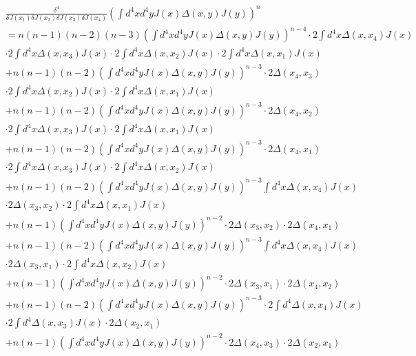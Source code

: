 \documentclass[a4paper]{article}
\begin{document}
\begin{equation}
    \begin{split}
        &\frac{\delta^4}{\delta J(x_{1})\delta J(x_{2})\delta J(x_{3})\delta J(x_{4})}(\int{d^4xd^4yJ(x)\Delta(x,y) J(y)})^{n}\\
        &=n(n-1)(n-2)(n-3)(\int{d^4xd^4yJ(x)\Delta(x,y) J(y)})^{n-4}\cdot 2\int{d^4x \Delta(x,x_{4}) J(x)}\\
        &\cdot 2\int{d^4x \Delta(x,x_{3}) J(x)}\cdot 2\int{d^4x \Delta(x,x_{2}) J(x)}\cdot2\int{d^4x \Delta(x,x_{1}) J(x)}\\
        &+n(n-1)(n-2)(\int{d^4xd^4yJ(x)\Delta(x,y) J(y)})^{n-3}\cdot 2\Delta(x_{4},x_{3})\\ 
        &\cdot 2\int{d^4x \Delta(x,x_{2}) J(x)}\cdot2\int{d^4x \Delta(x,x_{1})J(x)}\\
        &+n(n-1)(n-2)(\int{d^4xd^4yJ(x)\Delta(x,y) J(y)})^{n-3}\cdot 2\Delta(x_{4},x_{2})\\ 
        &\cdot 2\int{d^4x \Delta(x,x_{3}) J(x)}\cdot2\int{d^4x \Delta(x,x_{1})J(x)}\\
        &+n(n-1)(n-2)(\int{d^4xd^4yJ(x)\Delta(x,y) J(y)})^{n-3}\cdot 2\Delta(x_{4},x_{1})\\ 
        &\cdot 2\int{d^4x \Delta(x,x_{3}) J(x)}\cdot2\int{d^4x \Delta(x,x_{2})J(x)}\\
        &+n(n-1)(n-2)(\int{d^4xd^4yJ(x)\Delta(x,y) J(y)})^{n-3}\int{d^4x \Delta(x,x_{4})J(x)}\\
        &\cdot 2 \Delta(x_{3},x_{2})\cdot2\int{d^4x \Delta(x,x_{1})J(x)}\\
        &+n(n-1)(\int{d^4xd^4yJ(x)\Delta(x,y) J(y)})^{n-2}\cdot 2 \Delta(x_{3},x_{2})\cdot2 \Delta(x_{4},x_{1})\\
        &+n(n-1)(n-2)(\int{d^4xd^4yJ(x)\Delta(x,y) J(y)})^{n-3}\int{d^4x \Delta(x,x_{4})J(x)}\\
        &\cdot 2 \Delta(x_{3},x_{1})\cdot2\int{d^4x \Delta(x,x_{2})J(x)}\\
        &+n(n-1)(\int{d^4xd^4yJ(x)\Delta(x,y) J(y)})^{n-2}\cdot 2 \Delta(x_{3},x_{1})\cdot2 \Delta(x_{4},x_{2})\\
        &+n(n-1)(n-2)(\int{d^4xd^4yJ(x)\Delta(x,y) J(y)})^{n-3}\cdot2\int{d^4\Delta(x,x_{4})J(x)}\\
        &\cdot2\int{d^4\Delta(x,x_{3})J(x)}\cdot2\Delta(x_{2},x_{1})\\
        &+n(n-1)(\int{d^4xd^4yJ(x)\Delta(x,y) J(y)})^{n-2}\cdot2\Delta(x_{4},x_{3}) \cdot2\Delta(x_{2},x_{1})\\
    \end{split}
\end{equation}
\end{document}
